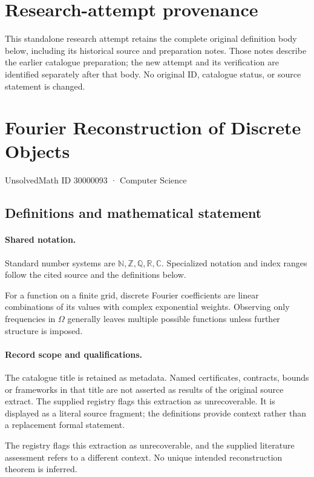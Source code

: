 \documentclass[11pt]{article}
\begin{document}
\section*{Research-attempt provenance}
This standalone research attempt retains the complete original definition body below,
including its historical source and preparation notes. Those notes describe the
earlier catalogue preparation; the new attempt and its verification are identified
separately after that body. No original ID, catalogue status, or source statement is changed.

\section{Fourier Reconstruction of Discrete Objects}\label{30000093}
{\small UnsolvedMath ID 30000093 · Computer Science}
\subsection{Definitions and mathematical statement}

\paragraph{Shared notation.}Standard number systems are $\mathbb N,\mathbb Z,\mathbb Q,\mathbb R,\mathbb C$. Specialized notation and index ranges follow the cited source and the definitions below.


For a function on a finite grid, discrete Fourier coefficients are linear combinations of its values with complex exponential weights. Observing only frequencies in $\Omega$ generally leaves multiple possible functions unless further structure is imposed.
\paragraph{Record scope and qualifications.}
The catalogue title is retained as metadata. Named certificates, contracts, bounds or frameworks in that title are not asserted as results of the original source extract.
The supplied registry flags this extraction as unrecoverable. It is displayed as a literal source fragment; the definitions provide context rather than a replacement formal statement.

The registry flags this extraction as unrecoverable, and the supplied literature assessment refers to a different context. No unique intended reconstruction theorem is inferred.
\end{document}
